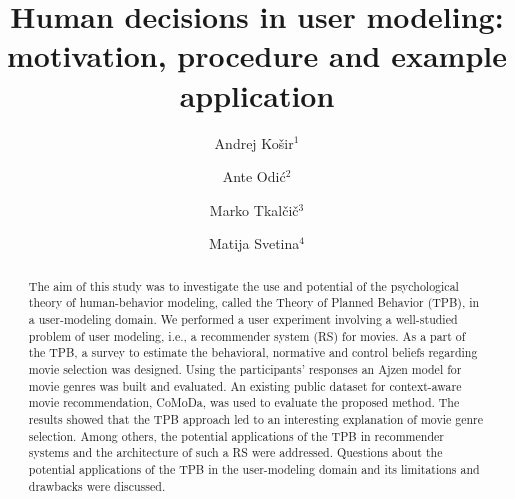 \documentclass{llncs}
\begin{document}
\frontmatter  
{}
\mainmatter 

\title{Human decisions in user modeling: motivation, procedure and example application}

\author{Andrej Košir$^1$ \and Ante Odić$^2$ \and Marko Tkalčič$^3$ \and Matija Svetina$^4$}


  
\maketitle            

\begin{abstract}   
The aim of this study was to investigate the use and potential of the psychological theory of human-behavior modeling, called the Theory of Planned Behavior (TPB), in a user-modeling domain. We performed a user experiment involving a well-studied problem of user modeling, i.e., a recommender system (RS) for movies. As a part of the TPB, a survey to estimate the behavioral, normative and control beliefs regarding movie selection was designed. Using the participants’ responses an Ajzen model for movie genres was built and evaluated. An existing public dataset for context-aware movie recommendation, CoMoDa, was used to evaluate the proposed method. The results showed that the TPB approach led to an interesting explanation of movie genre selection. Among others, the potential applications of the TPB in recommender systems and the architecture of such a RS were addressed. Questions about the potential applications of the TPB in the user-modeling domain and its limitations and drawbacks were discussed.
\end{abstract}
\end{document}
